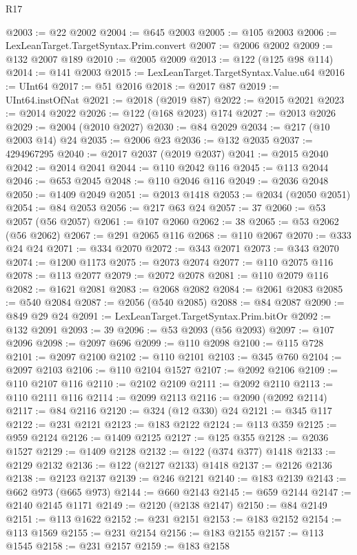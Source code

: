 \begin{lexlean}{R17}
\begin{coremodule}
@2003 := @22 @2002
@2004 := @645 @2003
@2005 := @105 @2003
@2006 := LexLeanTarget.TargetSyntax.Prim.convert
@2007 := @2006 @2002
@2009 := @132 @2007 @189
@2010 := @2005 @2009
@2013 := @122 (@125 @98 @114)
@2014 := @141 @2003
@2015 := LexLeanTarget.TargetSyntax.Value.u64
@2016 := UInt64
@2017 := @51 @2016
@2018 := @2017 @87
@2019 := UInt64.instOfNat
@2021 := @2018 (@2019 @87)
@2022 := @2015 @2021
@2023 := @2014 @2022
@2026 := @122 (@168 @2023) @174
@2027 := @2013 @2026
@2029 := @2004 (@2010 @2027)
@2030 := @84 @2029
@2034 := @217 (@10 @2003 @14) @24
@2035 := @2006 @23
@2036 := @132 @2035
@2037 := 4294967295
@2040 := @2017 @2037 (@2019 @2037)
@2041 := @2015 @2040
@2042 := @2014 @2041
@2044 := @110 @2042 @116
@2045 := @113 @2044
@2046 := @653 @2045
@2048 := @110 @2046 @116
@2049 := @2036 @2048
@2050 := @1409 @2049
@2051 := @2013 @1418
@2053 := @2034 (@2050 @2051)
@2054 := @84 @2053
@2056 := @217 @63 @24
@2057 := 37
@2060 := @53 @2057 (@56 @2057)
@2061 := @107 @2060
@2062 := 38
@2065 := @53 @2062 (@56 @2062)
@2067 := @291 @2065 @116
@2068 := @110 @2067
@2070 := @333 @24 @24
@2071 := @334 @2070
@2072 := @343 @2071
@2073 := @343 @2070
@2074 := @1200 @1173
@2075 := @2073 @2074
@2077 := @110 @2075 @116
@2078 := @113 @2077
@2079 := @2072 @2078
@2081 := @110 @2079 @116
@2082 := @1621 @2081
@2083 := @2068 @2082
@2084 := @2061 @2083
@2085 := @540 @2084
@2087 := @2056 (@540 @2085)
@2088 := @84 @2087
@2090 := @849 @29 @24
@2091 := LexLeanTarget.TargetSyntax.Prim.bitOr
@2092 := @132 @2091
@2093 := 39
@2096 := @53 @2093 (@56 @2093)
@2097 := @107 @2096
@2098 := @2097 @696
@2099 := @110 @2098
@2100 := @115 @728
@2101 := @2097 @2100
@2102 := @110 @2101
@2103 := @345 @760
@2104 := @2097 @2103
@2106 := @110 @2104 @1527
@2107 := @2092 @2106
@2109 := @110 @2107 @116
@2110 := @2102 @2109
@2111 := @2092 @2110
@2113 := @110 @2111 @116
@2114 := @2099 @2113
@2116 := @2090 (@2092 @2114)
@2117 := @84 @2116
@2120 := @324 (@12 @330) @24
@2121 := @345 @117
@2122 := @231 @2121
@2123 := @183 @2122
@2124 := @113 @359
@2125 := @959 @2124
@2126 := @1409 @2125
@2127 := @125 @355
@2128 := @2036 @1527
@2129 := @1409 @2128
@2132 := @122 (@374 @377) @1418
@2133 := @2129 @2132
@2136 := @122 (@2127 @2133) @1418
@2137 := @2126 @2136
@2138 := @2123 @2137
@2139 := @246 @2121
@2140 := @183 @2139
@2143 := @662 @973 (@665 @973)
@2144 := @660 @2143
@2145 := @659 @2144
@2147 := @2140 @2145 @1171
@2149 := @2120 (@2138 @2147)
@2150 := @84 @2149
@2151 := @113 @1622
@2152 := @231 @2151
@2153 := @183 @2152
@2154 := @113 @1569
@2155 := @231 @2154
@2156 := @183 @2155
@2157 := @113 @1545
@2158 := @231 @2157
@2159 := @183 @2158

\end{coremodule}
\end{lexlean}

